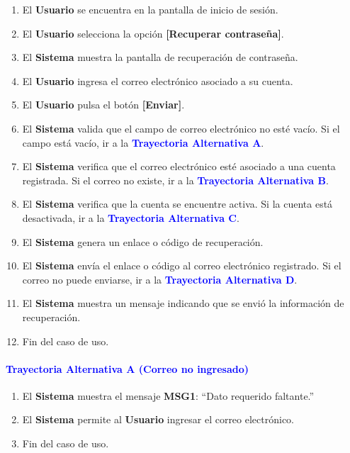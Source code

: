 \begin{enumerate}
    \item El \textbf{Usuario} se encuentra en la pantalla de inicio de sesión.
    \item El \textbf{Usuario} selecciona la opción \textbf{[Recuperar contraseña]}.
    \item El \textbf{Sistema} muestra la pantalla de recuperación de contraseña.
    \item El \textbf{Usuario} ingresa el correo electrónico asociado a su cuenta.
    \item El \textbf{Usuario} pulsa el botón \textbf{[Enviar]}.
    \item El \textbf{Sistema} valida que el campo de correo electrónico no esté vacío.
    Si el campo está vacío, ir a la \textbf{\textcolor{blue}{Trayectoria Alternativa A}}.
    \item El \textbf{Sistema} verifica que el correo electrónico esté asociado a una cuenta registrada.
    Si el correo no existe, ir a la \textbf{\textcolor{blue}{Trayectoria Alternativa B}}.
    \item El \textbf{Sistema} verifica que la cuenta se encuentre activa.
    Si la cuenta está desactivada, ir a la \textbf{\textcolor{blue}{Trayectoria Alternativa C}}.
    \item El \textbf{Sistema} genera un enlace o código de recuperación.
    \item El \textbf{Sistema} envía el enlace o código al correo electrónico registrado.
    Si el correo no puede enviarse, ir a la \textbf{\textcolor{blue}{Trayectoria Alternativa D}}.
    \item El \textbf{Sistema} muestra un mensaje indicando que se envió la información de recuperación.
    \item Fin del caso de uso.
\end{enumerate}

\paragraph{\textbf{\textcolor{blue}{Trayectoria Alternativa A (Correo no ingresado)}}}
\begin{enumerate}
    \item El \textbf{Sistema} muestra el mensaje \textbf{MSG1}: ``Dato requerido faltante.''
    \item El \textbf{Sistema} permite al \textbf{Usuario} ingresar el correo electrónico.
    \item Fin del caso de uso.
\end{enumerate}

